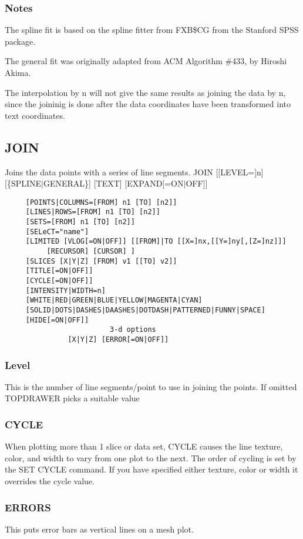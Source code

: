 \subsubsection{Notes}
The  spline  fit  is  based  on  the spline fitter from FXB\$CG from the
Stanford SPSS package.  

The  general  fit  was  originally  adapted from ACM Algorithm \#433, by
Hiroshi Akima.  

The  interpolation  by  n will not give the same results as joining the
data by n, since the joininig is done after the data  coordinates  have
been transformed into text coordinates.  
\subsection{JOIN}
Joins the data points with a series of line segments.  
JOIN [[LEVEL=]n] [\{SPLINE$|$GENERAL\}] [TEXT] [EXPAND[=ON$|$OFF]] 
\begin{verbatim}
     [POINTS|COLUMNS=[FROM] n1 [TO] [n2]] 
     [LINES|ROWS=[FROM] n1 [TO] [n2]] 
     [SETS=[FROM] n1 [TO] [n2]] 
     [SELeCT="name"] 
     [LIMITED [VLOG[=ON|OFF]] [[FROM]|TO [[X=]nx,[[Y=]ny[,[Z=]nz]]]
          [RECURSOR] [CURSOR] ] 
     [SLICES [X|Y|Z] [FROM] v1 [[TO] v2]] 
     [TITLE[=ON|OFF]] 
     [CYCLE[=ON|OFF]] 
     [INTENSITY|WIDTH=n] 
     [WHITE|RED|GREEN|BLUE|YELLOW|MAGENTA|CYAN] 
     [SOLID|DOTS|DASHES|DAASHES|DOTDASH|PATTERNED|FUNNY|SPACE] 
     [HIDE[=ON|OFF]] 
                         3-d options 
               [X|Y|Z] [ERROR[=ON|OFF]] 
\end{verbatim}
\subsubsection{Level}
This is the number of line segments/point to use in joining the points.
If omitted TOPDRAWER picks a suitable value 
\subsubsection{CYCLE}
When  plotting  more  than  1  slice or data set, CYCLE causes the line
texture, color, and width to vary from one plot to the next.  The order
of  cycling  is  set  by  the SET CYCLE command.  If you have specified
either texture, color or width it overrides the cycle value.  
\subsubsection{ERRORS}
This puts error bars as vertical lines on a mesh plot.  
